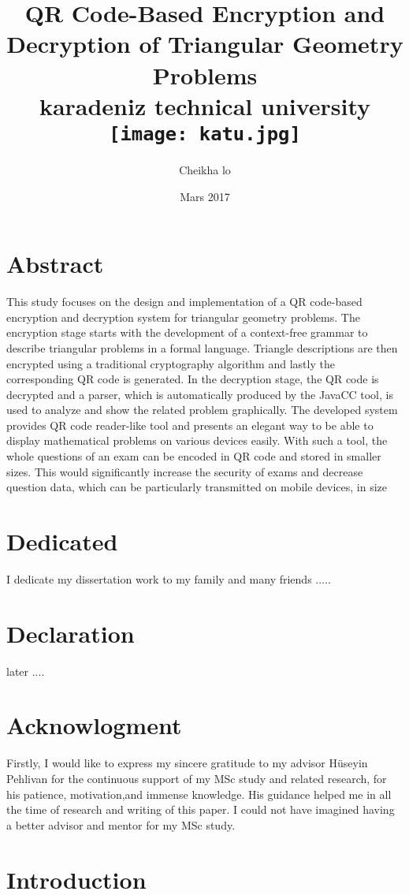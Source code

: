 \documentclass[12pt]{report}
\title{
{QR Code-Based Encryption and Decryption of Triangular Geometry
Problems}\\
{\large karadeniz technical university}
{\texttt{[image: katu.jpg]}}
}
\author{Cheikha lo}
\date{Mars 2017}
\begin{document}
\maketitle

\chapter*{Abstract}
This study focuses on the design and
implementation of a QR code-based encryption and decryption
system for triangular geometry problems. The encryption
stage starts with the development of a context-free grammar
to describe triangular problems in a formal language.
Triangle descriptions are then encrypted using a traditional
cryptography algorithm and lastly the corresponding QR
code is generated. In the decryption stage, the QR code is
decrypted and a parser, which is automatically produced by
the JavaCC tool, is used to analyze and show the related
problem graphically. The developed system provides QR code
reader-like tool and presents an elegant way to be able to
display mathematical problems on various devices easily. With
such a tool, the whole questions of an exam can be encoded in
QR code and stored in smaller sizes. This would significantly
increase the security of exams and decrease question data,
which can be particularly transmitted on mobile devices, in size

\chapter*{Dedicated}
I dedicate my dissertation work to my family and many friends ..... 

\chapter*{Declaration}
later ....

\chapter*{Acknowlogment}
Firstly, I would like to express my sincere gratitude to my
advisor Hüseyin Pehlivan for the continuous support of my
MSc study and related research, for his patience, motivation,and immense knowledge. His guidance helped me in all the time of research and writing of this paper. I could not have imagined having a better advisor and mentor for my MSc
study.

\tableofcontents

\chapter{Introduction}

\end{document}

